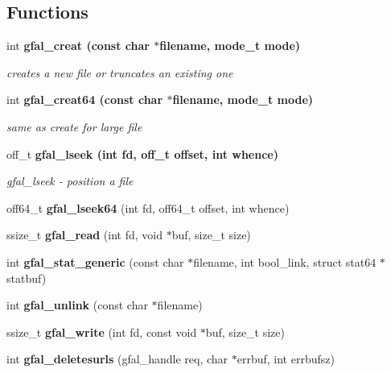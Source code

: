 \subsection*{Functions}
\begin{CompactItemize}
\item 
int \bf{gfal\_\-creat} (const char $\ast$filename, mode\_\-t mode)
\begin{CompactList}\small\item\em creates a new file or truncates an existing one \item\end{CompactList}\item 
int \bf{gfal\_\-creat64} (const char $\ast$filename, mode\_\-t mode)\label{group__posix__group_g48783e60cafa1a3bf9aa2170b99f9b08}

\begin{CompactList}\small\item\em same as create for large file \item\end{CompactList}\item 
off\_\-t \bf{gfal\_\-lseek} (int fd, off\_\-t offset, int whence)
\begin{CompactList}\small\item\em gfal\_\-lseek - position a file \item\end{CompactList}\item 
off64\_\-t \textbf{gfal\_\-lseek64} (int fd, off64\_\-t offset, int whence)\label{group__posix__group_g39c7d0b6d366fdb0f218439ed3c3bb37}

\item 
ssize\_\-t \textbf{gfal\_\-read} (int fd, void $\ast$buf, size\_\-t size)\label{group__posix__group_gaa6bfe36f33b86e489b798aed96912de}

\item 
int \textbf{gfal\_\-stat\_\-generic} (const char $\ast$filename, int bool\_\-link, struct stat64 $\ast$statbuf)\label{gfal__posix_8c_678840d435b1b1a34645fa21d34e1102}

\item 
int \textbf{gfal\_\-unlink} (const char $\ast$filename)\label{group__posix__group_gdeb4c6cc47f507da3e3b498374e308fb}

\item 
ssize\_\-t \textbf{gfal\_\-write} (int fd, const void $\ast$buf, size\_\-t size)\label{group__posix__group_g00c2d64894ae81c05846b06c84727ae9}

\item 
int \textbf{gfal\_\-deletesurls} (gfal\_\-handle req, char $\ast$errbuf, int errbufsz)\label{gfal__posix_8c_72e48640200202bb9e9cf47e8a71f942}


\end{CompactItemize}
